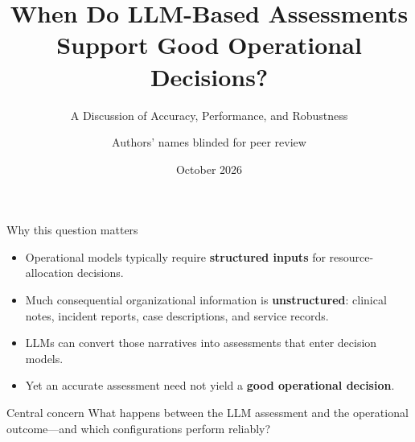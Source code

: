 \documentclass[aspectratio=169,11pt]{beamer}
\title[LLM Assessments and Decisions]{When Do LLM-Based Assessments Support Good Operational Decisions?}
\subtitle{A Discussion of Accuracy, Performance, and Robustness}
\author{Authors' names blinded for peer review}
\date{October 2026}
\newcommand{\key}[1]{\textcolor{deepblue}{\textbf{#1}}}
\begin{document}
\begin{frame}
\titlepage
\end{frame}

\begin{frame}{Why this question matters}

\begin{itemize}
\setlength{\itemsep}{10pt}

\item Operational models typically require \key{structured inputs} for resource-allocation decisions.

\item Much consequential organizational information is \key{unstructured}: clinical notes, incident reports, case descriptions, and service records.

\item LLMs can convert those narratives into assessments that enter decision models.

\item Yet an accurate assessment need not yield a \key{good operational decision}.

\end{itemize}

\begin{block}{Central concern}
What happens between the LLM assessment and the operational outcome---and which configurations perform reliably?
\end{block}

\end{frame}
\end{document}
